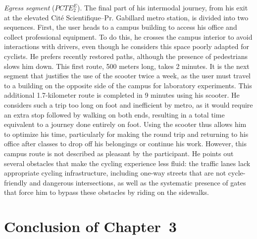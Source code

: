 \begin{refsegment}
\textsl{Egress segment} (\(PCTE^{E}_{2}\)). The final part of his intermodal journey, from his exit at the elevated Cité Scientifique–Pr. Gabillard metro station, is divided into two sequences. First, the user heads to a campus building to access his office and collect professional equipment. To do this, he crosses the campus interior to avoid interactions with drivers, even though he considers this space poorly adapted for cyclists. He prefers recently restored paths, although the presence of pedestrians slows him down. This first route, 500 meters long, takes 2 minutes. It is the next segment that justifies the use of the scooter twice a week, as the user must travel to a building on the opposite side of the campus for laboratory experiments. This additional 1.7-kilometer route is completed in 9 minutes using his scooter. He considers such a trip too long on foot and inefficient by metro, as it would require an extra stop followed by walking on both ends, resulting in a total time equivalent to a journey done entirely on foot. Using the scooter thus allows him to optimize his time, particularly for making the round trip and returning to his office after classes to drop off his belongings or continue his work. However, this campus route is not described as pleasant by the participant. He points out several obstacles that make the cycling experience less fluid: the traffic lanes lack appropriate cycling infrastructure, including one-way streets that are not cycle-friendly and dangerous intersections, as well as the systematic presence of gates that force him to bypass these obstacles by riding on the sidewalks.%

\newpage
{} %
\section*{Conclusion of Chapter~3
    \label{chap3:conclusion}
    }


\end{refsegment}
